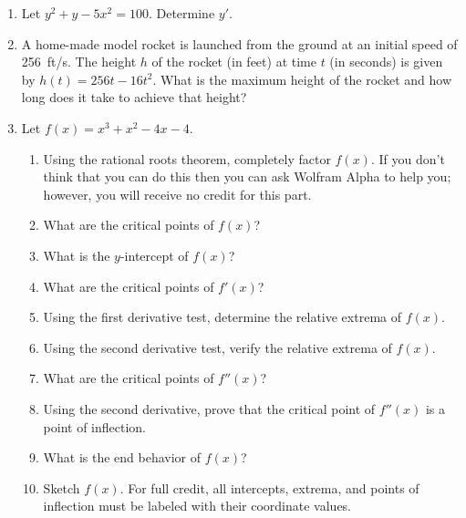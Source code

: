 \documentclass[letterpaper,12pt,fleqn]{article}
\begin{document}
\begin{enumerate}[left=0pt,itemsep=0.5in]
\item Let \(y^2+y-5x^2=100\).  Determine \(y'\).

\item A home-made model rocket is launched from the ground at an initial speed of \SI{256}{ft/s}.  The height \(h\)
  of the rocket (in feet) at time \(t\) (in seconds) is given by \(h(t)=256t-16t^2\).  What is the maximum height of
  the rocket and how long does it take to achieve that height?

\item Let \(f(x)=x^3+x^2-4x-4\).
  \begin{enumerate}
  \item Using the rational roots theorem, completely factor \(f(x)\).  If you don't think that you can do this
    then you can ask Wolfram Alpha to help you; however, you will receive no credit for this part.
  \item What are the critical points of \(f(x)\)?
  \item What is the \(y\)-intercept of \(f(x)\)?
  \item What are the critical points of \(f'(x)\)?
  \item Using the first derivative test, determine the relative extrema of \(f(x)\).
  \item Using the second derivative test, verify the relative extrema of \(f(x)\).
  \item What are the critical points of \(f''(x)\)?
  \item Using the second derivative, prove that the critical point of \(f''(x)\) is a point of inflection.
  \item What is the end behavior of \(f(x)\)?
  \item Sketch \(f(x)\).  For full credit, all intercepts, extrema, and points of inflection must be labeled with
    their coordinate values.
  \end{enumerate}

\end{enumerate}
\end{document}
